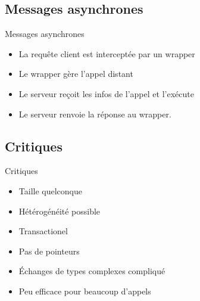 \begin{frame}{\sectitle}
    \def\subsectitle{Messages asynchrones}
    \subsection{\subsectitle}
    \begin{block}{\subsectitle}
        \begin{itemize}
            \item La requête client est interceptée par un wrapper
            \item Le wrapper gère l'appel distant
            \item Le serveur reçoit les infos de l'appel et l'exécute
            \item Le serveur renvoie la réponse au wrapper.
        \end{itemize}
    \end{block}
    \def\subsectitle{Critiques}
    \subsection{\subsectitle}
    \begin{block}{\subsectitle}
        \begin{itemize}
            \item Taille quelconque
            \item Hétérogénéité possible
            \item Transactionel 
            \item Pas de pointeurs
            \item Échanges de types complexes compliqué
            \item Peu efficace pour beaucoup d'appels
        \end{itemize}
    \end{block}
\end{frame}

